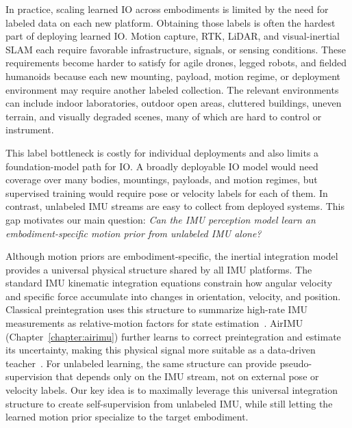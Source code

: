 In practice, scaling learned IO across embodiments is limited by the need for labeled data on each new platform.
Obtaining those labels is often the hardest part of deploying learned IO.
Motion capture, RTK, LiDAR, and visual-inertial SLAM each require favorable infrastructure, signals, or sensing conditions.
These requirements become harder to satisfy for agile drones, legged robots, and fielded humanoids because each new mounting, payload, motion regime, or deployment environment may require another labeled collection.
The relevant environments can include indoor laboratories, outdoor open areas, cluttered buildings, uneven terrain, and visually degraded scenes, many of which are hard to control or instrument.

This label bottleneck is costly for individual deployments and also limits a foundation-model path for IO.
A broadly deployable IO model would need coverage over many bodies, mountings, payloads, and motion regimes, but supervised training would require pose or velocity labels for each of them.
In contrast, unlabeled IMU streams are easy to collect from deployed systems.
This gap motivates our main question: \textit{Can the IMU perception model learn an embodiment-specific motion prior from unlabeled IMU alone?}

Although motion priors are embodiment-specific, the inertial integration model provides a universal physical structure shared by all IMU platforms.
The standard IMU kinematic integration equations constrain how angular velocity and specific force accumulate into changes in orientation, velocity, and position.
Classical preintegration uses this structure to summarize high-rate IMU measurements as relative-motion factors for state estimation~\cite{forster2015imu}.
AirIMU (Chapter~\ref{chapter:airimu}) further learns to correct preintegration and estimate its uncertainty, making this physical signal more suitable as a data-driven teacher~\cite{qiu2023airimu}.
For unlabeled learning, the same structure can provide pseudo-supervision that depends only on the IMU stream, not on external pose or velocity labels.
Our key idea is to maximally leverage this universal integration structure to create self-supervision from unlabeled IMU, while still letting the learned motion prior specialize to the target embodiment.

